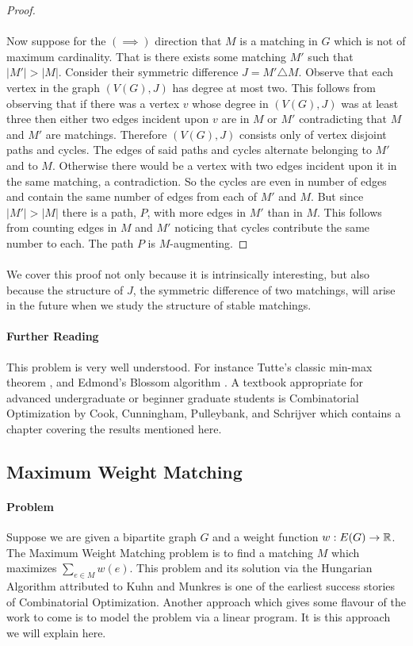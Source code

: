 \begin{proof}
\paragraph{}
Now suppose for the $(\implies)$ direction that $M$ is a matching in $G$ which is not of maximum cardinality. That is there exists some matching $M'$ such that $|M'| > |M|$. Consider their symmetric difference $J = M' \triangle M$. Observe that each vertex in the graph $(V(G), J)$ has degree at most two. This follows from observing that if there was a vertex $v$ whose degree in $(V(G), J)$ was at least three then either two edges incident upon $v$ are in $M$ or $M'$ contradicting that $M$ and $M'$ are matchings. Therefore $(V(G), J)$ consists only of vertex disjoint paths and cycles. The edges of said paths and cycles alternate belonging to $M'$ and to $M$. Otherwise there would be a vertex with two edges incident upon it in the same matching, a contradiction. So the cycles are even in number of edges and contain the same number of edges from each of $M'$ and $M$. But since $|M'| > |M|$ there is a path, $P$, with more edges in $M'$ than in $M$. This follows from counting edges in $M$ and $M'$ noticing that cycles contribute the same number to each. The path $P$ is $M$-augmenting.
\end{proof}
\paragraph{}
We cover this proof not only because it is intrinsically interesting, but also because the structure of $J$, the symmetric difference of two matchings, will arise in the future when we study the structure of stable matchings.
\paragraph{Further Reading}
This problem is very well understood. For instance Tutte's classic min-max theorem \cite{tutte1947factorization}, and Edmond's Blossom algorithm \cite{edmonds1965paths}. A textbook appropriate for advanced undergraduate or beginner graduate students is Combinatorial Optimization by Cook, Cunningham, Pulleybank, and Schrijver \cite{cook2009combinatorial} which contains a chapter covering the results mentioned here.
\subsection{Maximum Weight Matching}\label{GT:MWM}
\paragraph{Problem} Suppose we are given a bipartite graph $G$ and a weight function $w : E(G) \rightarrow \mathbb{R}$. The Maximum Weight Matching problem is to find a matching $M$ which maximizes $\sum_{e \in M} w(e)$. This problem and its solution via the Hungarian Algorithm attributed to Kuhn and Munkres \cite{kuhn1955hungarian}\cite{munkres1957algorithms} is one of the earliest success stories of Combinatorial Optimization. Another approach which gives some flavour of the work to come is to model the problem via a linear program. It is this approach we will explain here.

